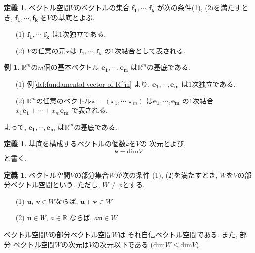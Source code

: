 \documentclass[a4j,12pt]{jarticle}
\theoremstyle{definition}
\newtheorem{definition}[theorem]{定義}
\newtheorem{example}[theorem]{例}
\begin{document}
\begin{definition}\label{def:basis}
    ベクトル空間$V$のベクトルの集合
    $\boldsymbol{f_1},\cdots ,\boldsymbol{f_k}$
    が次の条件(1), (2)を満たすとき, 
    $\boldsymbol{f_1},\cdots ,\boldsymbol{f_k}$
    を$V$の基底とよぶ. 
    \begin{itemize}
        \item[(1)]
        $\boldsymbol{f_1},\cdots ,\boldsymbol{f_k}$
        は$1$次独立である. 
        \item[(2)]
        $V$の任意の元$\boldsymbol{v}$は
        $\boldsymbol{f_1},\cdots ,\boldsymbol{f_k}$
        の$1$次結合として表される. 
    \end{itemize}
\end{definition}
\begin{example}
    $\mathbb{R}^m$の$m$個の基本ベクトル
    $\boldsymbol{e_1},\cdots ,\boldsymbol{e_m}$
    は$\mathbb{R}^m$の基底である. 
    \begin{itemize}
        \item[(1)]
        例\ref{def:fundamental vector of R^m}
        より, 
        $\boldsymbol{e_1},\cdots ,\boldsymbol{e_m}$
        は$1$次独立である. 
        \item[(2)]
        $\mathbb{R}^m$の任意のベクトル$\boldsymbol{x}
        =(x_1,\cdots ,x_m)$
        は$\boldsymbol{e_1},\cdots ,\boldsymbol{e_m}$
        の$1$次結合
        $x_1\boldsymbol{e_1}+\cdots +x_m\boldsymbol{e_m}$
        で表される. 
    \end{itemize}
    よって, $\boldsymbol{e_1},\cdots ,\boldsymbol{e_m}$
    は$\mathbb{R}^m$の基底である.
\end{example}
\begin{definition}
    基底を構成するベクトルの個数$k$を$V$の
    次元とよび, 
    $$k=\text{dim}V$$
    と書く. 
\end{definition}
\begin{definition}
    ベクトル空間$V$の部分集合$W$が次の条件
    (1), (2)を満たすとき, 
    $W
    $を$V$の部分ベクトル空間という. ただし, 
    $W \neq \phi$とする. 
    \begin{itemize}
        \item[(1)]
        $\boldsymbol{u},\ \boldsymbol{v}
        \in W$ならば, 
        $\boldsymbol{u}+\boldsymbol{v}\in W$
        \item[(2)]
        $\boldsymbol{u}\in W$, $a\in \mathbb{R}$
        ならば, $a\boldsymbol{u}\in W$
    \end{itemize}
\end{definition}
ベクトル空間$V$の部分ベクトル空間$W$は
それ自信ベクトル空間である. また, 部分
ベクトル空間$W$の次元は$V$の次元以下である
($\text{dim}W\leq \text{dim}V$). 
\end{document}
